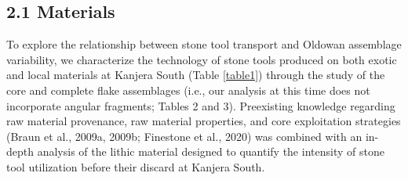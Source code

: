\documentclass[]{elsarticle} %
\begin{document}
\hypertarget{materials}{%
\subsection{2.1 Materials}\label{materials}}

To explore the relationship between stone tool transport and Oldowan
assemblage variability, we characterize the technology of stone tools
produced on both exotic and local materials at Kanjera South
(\hspace{0pt}Table \ref{table1}\hspace{0pt}) through the study of the
core and complete flake assemblages (i.e., our analysis at this time
does not incorporate angular fragments; \hspace{0pt}Tables 2 and
3\hspace{0pt}). Preexisting knowledge regarding raw material provenance,
raw material properties, and core exploitation strategies
(\hspace{0pt}Braun et al., 2009a\hspace{0pt},
\hspace{0pt}2009b\hspace{0pt}; \hspace{0pt}Finestone et al.,
2020\hspace{0pt}) was combined with an in-depth analysis of the lithic
material designed to quantify the intensity of stone tool utilization
before their discard at Kanjera South.

\begin{landscape}\begin{table}[!h]

\caption{\label{tab:cores prep}A summary of the cores included in this analysis. \label{table2}}
\centering
{}
\end{table}
\end{landscape}
\end{document}
